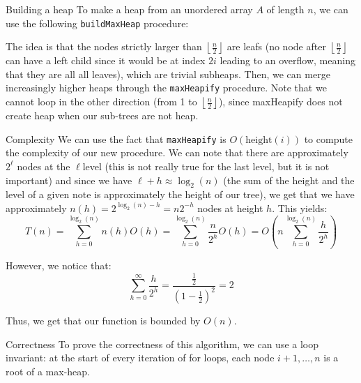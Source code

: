 \documentclass[a4paper]{article}
\begin{document}
\begin{parag}{Building a heap}
    To make a heap from an unordered array $A$ of length $n$, we can use the following \texttt{buildMaxHeap} procedure:
    
    The idea is that the nodes strictly larger than $\left\lfloor \frac{n}{2} \right\rfloor $ are leafs (no node after $\left\lfloor \frac{n}{2} \right\rfloor $ can have a left child since it would be at index $2i$ leading to an overflow, meaning that they are all all leaves), which are trivial subheaps. Then, we can merge increasingly higher heaps through the \texttt{maxHeapify} procedure. Note that we cannot loop in the other direction (from 1 to $\left\lfloor \frac{n}{2} \right\rfloor $), since maxHeapify does not create heap when our sub-trees are not heap. 

    \begin{subparag}{Complexity}
        We can use the fact that \texttt{maxHeapify} is $O\left(\text{height}\left(i\right)\right)$ to compute the complexity of our new procedure. We can note that there are approximately $2^\ell $ nodes at the $\ell $\Th level (this is not really true for the last level, but it is not important) and since we have $\ell + h \approx \log_2\left(n\right)$ (the sum of the height and the level of a given note is approximately the height of our tree), we get that we have approximately $n\left(h\right) = 2^{\log_2\left(n\right) - h} = n2^{-h}$ nodes at height $h$. This yields:
        \[T\left(n\right) = \sum_{h=0}^{\log_2\left(n\right)} n\left(h\right) O\left(h\right) = \sum_{h=0}^{\log_2\left(n\right)} \frac{n}{2^h} O\left(h\right) = O\left(n\sum_{h=0}^{\log_2\left(n\right)} \frac{h}{2^h}\right)\]

        However, we notice that: 
        \[\sum_{h=0}^{\infty} \frac{h}{2^h} = \frac{\frac{1}{2}}{\left(1 - \frac{1}{2}\right)^2} = 2\]
        
        Thus, we get that our function is bounded by $O\left(n\right)$.
    \end{subparag}

    \begin{subparag}{Correctness}
        To prove the correctness of this algorithm, we can use a loop invariant: at the start of every iteration of for loops, each node $i+1, \ldots, n$ is a root of a max-heap.


\end{subparag}
\end{parag}
\end{document}
